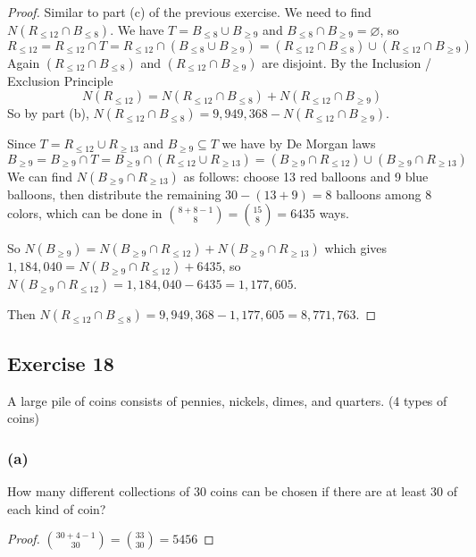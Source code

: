 \documentclass[14pt]{extarticle}
\newcommand{\es}{\varnothing}
\begin{document}
\begin{proof}
     Similar to part (c) of the previous exercise. We need to find \(N(R_{\leq 12} \cap B_{\leq 8})\). We have \(T = B_{\leq 8}
     \cup B_{\geq 9}\) and \(B_{\leq 8} \cap B_{\geq 9} = \es\), so
     \[
          R_{\leq 12} = R_{\leq 12} \cap T = R_{\leq 12} \cap (B_{\leq 8} \cup B_{\geq 9}) = (R_{\leq 12} \cap B_{\leq 8}) \cup
          (R_{\leq 12} \cap B_{\geq 9})
     \]
     Again \((R_{\leq 12} \cap B_{\leq 8})\) and \((R_{\leq 12} \cap B_{\geq 9})\) are disjoint. By the Inclusion / Exclusion
     Principle
     \[
          N(R_{\leq 12}) = N(R_{\leq 12} \cap B_{\leq 8}) + N(R_{\leq 12} \cap B_{\geq 9})
     \]
     So by part (b), \(N(R_{\leq 12} \cap B_{\leq 8}) = 9,949,368 - N(R_{\leq 12} \cap B_{\geq 9})\).

     Since \(T = R_{\leq 12} \cup R_{\geq 13}\) and \(B_{\geq 9} \subseteq T\) we have by De Morgan laws
     \[
          B_{\geq 9} = B_{\geq 9} \cap T = B_{\geq 9} \cap (R_{\leq 12} \cup R_{\geq 13}) = (B_{\geq 9} \cap R_{\leq 12}) \cup
          (B_{\geq 9} \cap R_{\geq 13})
     \]
     We can find \(N(B_{\geq 9} \cap R_{\geq 13})\) as follows: choose 13 red balloons and 9 blue balloons, then distribute
     the remaining \(30 - (13+9) = 8\) balloons among 8 colors, which can be done in \(\binom{8+8-1}{8} = \binom{15}{8} =
     6435\) ways.

     So \(N(B_{\geq 9}) = N(B_{\geq 9} \cap R_{\leq 12}) + N(B_{\geq 9} \cap R_{\geq 13})\) which gives \(1,184,040 =
     N(B_{\geq 9} \cap R_{\leq 12}) + 6435\), so \(N(B_{\geq 9} \cap R_{\leq 12}) = 1,184,040 - 6435 = 1,177,605\).

     Then \(N(R_{\leq 12} \cap B_{\leq 8}) = 9,949,368 - 1,177,605 = 8,771,763\).
\end{proof}

\subsection{Exercise 18}
A large pile of coins consists of pennies, nickels, dimes, and quarters. (4 types of coins)

\subsubsection{(a)}
How many different collections of 30 coins can be chosen if there are at least 30 of each kind of coin?

\begin{proof}
     \(\binom{30+4-1}{30} = \binom{33}{30} = 5456\)
\end{proof}
\end{document}
